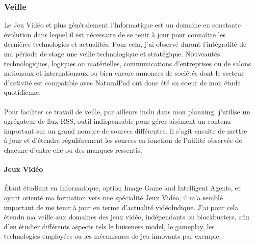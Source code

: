 	\subsubsection{Veille}
Le Jeu Vidéo et plus généralement l'Informatique est un domaine en constante évolution dans lequel il est nécessaire de se tenir à jour pour connaître les dernières technologies et actualités. Pour cela, j'ai observé durant l'intégralité de ma période de stage une veille technologique et stratégique. Nouveautés technologiques, logiques ou matérielles, communications d'entreprises ou de salons nationaux et internationaux ou bien encore annonces de sociétés dont le secteur d'activité est compatible avec NaturalPad ont donc été au coeur de mon étude quotidienne.
\paragraph{}Pour faciliter ce travail de veille, par ailleurs inclu dans mon planning, j'utilise un agrégateur de flux RSS, outil indispensable pour gérer aisément un contenu important sur un grand nombre de sources différentes. Il s'agit ensuite de mettre à jour et d'étendre régulièrement les sources en fonction de l'utilité observée de chacune d'entre elle ou des manques ressentis.
\paragraph{Jeux Vidéo\\ \quad}
Étant étudiant en Informatique, option Image Game and Intelligent Agents, et ayant orienté ma formation vers une spécialité Jeux Vidéo, il m'a semblé important de me tenir à jour en terme d'actualité vidéoludique. J'ai pour cela étendu ma veille aux domaines des jeux vidéo, indépendants ou blockbusters, afin d'en étudier différents aspects tels le buiseness model, le gameplay, les technologies employées ou les mécanismes de jeu innovants par exemple.
